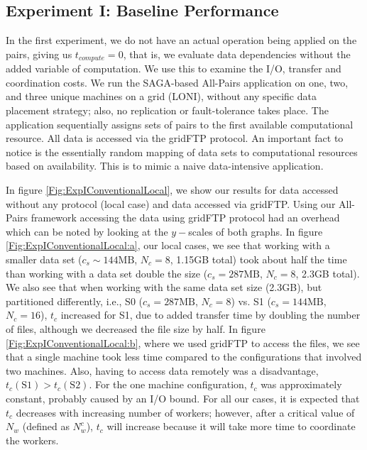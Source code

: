 \documentclass{rspublic}
\begin{document}
\vspace{-0.3cm}

\subsection{Experiment I: Baseline Performance}\label{Sec:gridFTPExp}
In the first experiment, we do not have an actual operation being
applied on the pairs, giving us $t_{compute}=0$, that is, we evaluate
data dependencies without the added variable of computation. We use
this to examine the I/O, transfer and coordination costs. We run the
SAGA-based All-Pairs application on one, two, and three unique
machines on a grid (LONI), without any specific data placement
strategy; also, no replication or fault-tolerance takes place. The
application sequentially assigns sets of pairs to the first available
computational resource. All data is accessed via the gridFTP
protocol. An important fact to notice is the essentially random
mapping of data sets to computational resources based on
availability. This is to mimic a naive data-intensive application.

In figure \ref{Fig:ExpIConventionalLocal}, we show our results for
data accessed without any protocol (local case) and data accessed via
gridFTP. Using our All-Pairs framework accessing the data using
gridFTP protocol had an overhead which can be noted by looking at the
$y-$scales of both graphs. In figure
\ref{Fig:ExpIConventionalLocal:a}, our local cases, we see that
working with a smaller data set ($c_s \sim 144\mbox{MB}$, $N_c = 8$, 1.15GB
total) took about half the time than working with a data set double
the size ($c_s = 287\mbox{MB}$, $N_c = 8$, 2.3GB total). We also see that
when working with the same data set size (2.3GB), but partitioned
differently, i.e., S0 ($c_s = 287\mbox{MB}$, $N_c = 8$) vs. S1 ($c_s =
144\mbox{MB}$, $N_c = 16$), $t_c$ increased for S1, due to added transfer
time by doubling the number of files, although we decreased the file
size by half. In figure \ref{Fig:ExpIConventionalLocal:b}, where we
used gridFTP to access the files, we see that a single machine took
less time compared to the configurations that involved two
machines. Also, having to access data remotely was a disadvantage,
$t_c(\mbox{S1}) > t_c(\mbox{S2})$. For the one machine configuration,
$t_c$ was approximately constant, probably caused by an I/O bound. For
all our cases, it is expected that $t_c$ decreases with increasing
number of workers; however, after a critical value of $N_w$ (defined
as $N^c_w$), $t_c$ will increase because it will take more time to
coordinate the workers.
\end{document}
